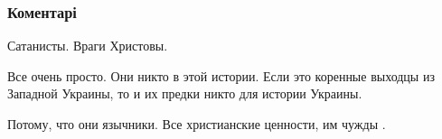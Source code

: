  
 
 
 
 
\subsubsection{Коментарі}
\label{sec:28_07_2021.fb.berdnik_miroslava.1.nacionalisty_pamjatnik_kiev.cmt}

\begin{itemize}
 
Сатанисты. Враги Христовы.

 
Все очень просто. Они никто в этой истории. Если это коренные выходцы из Западной Украины, то и их предки никто для истории Украины.

 
Потому, что они язычники. Все христианские ценности, им чужды .
\end{itemize}

